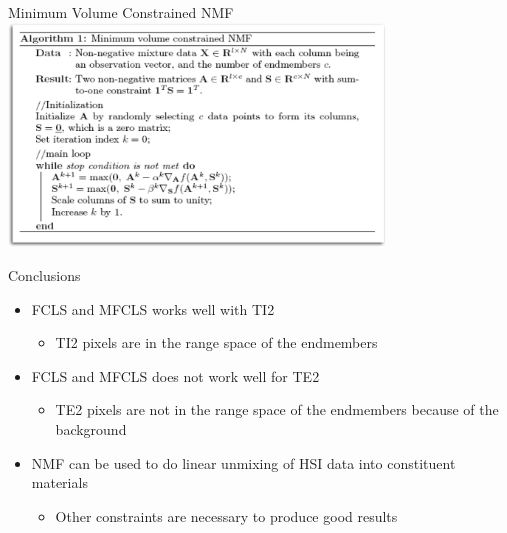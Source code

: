 \documentclass{beamer}
\begin{document}
\begin{frame}{Minimum Volume Constrained NMF}
\includegraphics[width=10cm, center]{mvc_mnf}
\end{frame}

\begin{frame}{Conclusions}

\begin{itemize}
\item FCLS and MFCLS works well with TI2
    \begin{itemize}
        \item TI2 pixels are in the range space of the endmembers
    \end{itemize}
\item FCLS and MFCLS does not work well for TE2
    \begin{itemize}
        \item TE2 pixels are not in the range space of the endmembers because of the background
    \end{itemize}
\item NMF can be used to do linear unmixing of HSI data into constituent materials
    \begin{itemize}
        \item Other constraints are necessary to produce good results
    \end{itemize}
\end{itemize}

\end{frame}
\end{document}
